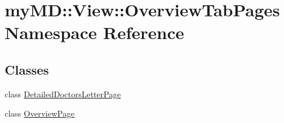 \hypertarget{namespacemy_m_d_1_1_view_1_1_overview_tab_pages}{
\section{my\-MD::View::Overview\-Tab\-Pages Namespace Reference}
\label{d6/db8/namespacemy_m_d_1_1_view_1_1_overview_tab_pages}
}


\subsection*{Classes}
\begin{CompactItemize}
\item 
class \hyperlink{classmy_m_d_1_1_view_1_1_overview_tab_pages_1_1_detailed_doctors_letter_page}{Detailed\-Doctors\-Letter\-Page}
\item 
class \hyperlink{classmy_m_d_1_1_view_1_1_overview_tab_pages_1_1_overview_page}{Overview\-Page}
\end{CompactItemize}
